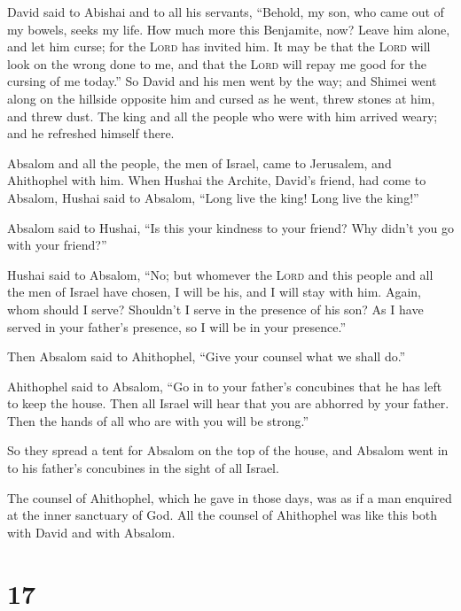  David said to Abishai and to all his servants, ``Behold,
my son, who came out of my bowels, seeks my life. How much more this
Benjamite, now? Leave him alone, and let him curse; for the
\textsc{Lord} has invited him.  It may be that the
\textsc{Lord} will look on the wrong done to me, and that the
\textsc{Lord} will repay me good for the cursing of me today.''
 So David and his men went by the way; and Shimei went
along on the hillside opposite him and cursed as he went, threw stones
at him, and threw dust.  The king and all the people who
were with him arrived weary; and he refreshed himself there.

 Absalom and all the people, the men of Israel, came to
Jerusalem, and Ahithophel with him.  When Hushai the
Archite, David's friend, had come to Absalom, Hushai said to Absalom,
``Long live the king! Long live the king!''

 Absalom said to Hushai, ``Is this your kindness to your
friend? Why didn't you go with your friend?''

 Hushai said to Absalom, ``No; but whomever the
\textsc{Lord} and this people and all the men of Israel have chosen, I
will be his, and I will stay with him.  Again, whom
should I serve? Shouldn't I serve in the presence of his son? As I have
served in your father's presence, so I will be in your presence.''

 Then Absalom said to Ahithophel, ``Give your counsel
what we shall do.''

 Ahithophel said to Absalom, ``Go in to your father's
concubines that he has left to keep the house. Then all Israel will hear
that you are abhorred by your father. Then the hands of all who are with
you will be strong.''

 So they spread a tent for Absalom on the top of the
house, and Absalom went in to his father's concubines in the sight of
all Israel.

 The counsel of Ahithophel, which he gave in those days,
was as if a man enquired at the inner sanctuary of God. All the counsel
of Ahithophel was like this both with David and with Absalom.

\hypertarget{section-16}{%
\section{17}\label{section-16}}

